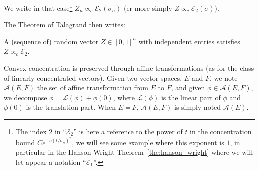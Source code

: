 \documentclass{ws-rmta}
\begin{document}
\begin{definition}
   We write in that case\footnote{The index $2$ in ``$\mathcal E_2$'' is here a reference to the power of $t$ in the concentration bound $C e^{-c(t/\sigma_n)^2}$, we will see some example where this exponent is $1$, in particular in the Hanson-Wright Theorem~\ref{the:hanson_wright} where we will let appear a notation ``$\mathcal E_1$''.} $Z_n \propto_c \mathcal E_{2}(\sigma_n)$ (or more simply $Z \propto_c \mathcal E_{2}(\sigma)$).
\end{definition}
The Theorem of Talagrand then writes:
\begin{theorem}\label{the:talagrand}
  A (sequence of) random vector $Z \in [0,1]^n$ with independent entries satisfies $Z \propto_c \mathcal E_2$.
\end{theorem}
Convex concentration is preserved through affine transformations (as for the class of linearly concentrated vectors). Given two vector spaces, $E$ and $F$, we note $\mathcal A(E,F)$ the set of affine transformation from $E$ to $F$, and given $\phi\in \mathcal A(E,F)$, we decompose $\phi = \mathcal L(\phi) + \phi(0)$, where $\mathcal L(\phi)$ is the linear part of $\phi$ and $\phi(0)$ is the translation part. When $E=F$, $\mathcal A(E,F)$ is simply noted $\mathcal A(E)$.
\end{document}
